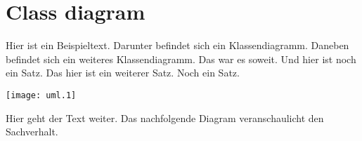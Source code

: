 \documentclass[a4paper,12pt]{article}
\begin{document}
\section{Class diagram}
Hier ist ein Beispieltext. Darunter befindet sich ein Klassendiagramm. Daneben befindet sich ein weiteres Klassendiagramm. Das war es soweit. Und hier ist noch ein Satz. Das hier ist ein weiterer Satz. Noch ein Satz.
\begin{center}
\texttt{[image: uml.1]}
\end{center}
Hier geht der Text weiter. Das nachfolgende Diagram veranschaulicht den Sachverhalt.
\end{document}
